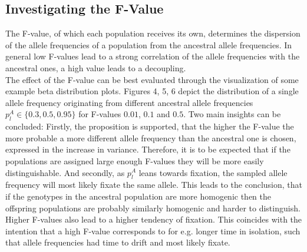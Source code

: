\documentclass[a4paper, 11pt]{article}
\begin{document}
\subsection{Investigating the F-Value}
The F-value, of which each population receives its own, determines the dispersion of the allele frequencies of a population from the ancestral allele frequencies. In general low F-values lead to a strong correlation of the allele frequencies with the ancestral ones, a high value leads to a decoupling.\\
The effect of the F-value can be best evaluated through the visualization of some example beta distribution plots. Figures 4, 5, 6 depict the distribution of a single allele frequency originating from different ancestral allele frequencies $p^A_l \in \{0.3, 0.5, 0.95\}$ for F-values $0.01$, $0.1$ and $0.5$. Two main insights can be concluded: Firstly, the proposition is supported, that the higher the F-value the more probable a more different allele frequency than the ancestral one is chosen, expressed in the increase in variance. Therefore, it is to be expected that if the populations are assigned large enough F-values they will be more easily distinguishable. And secondly, as $p_l^A$ leans towards fixation, the sampled allele frequency will most likely fixate the same allele. This leads to the conclusion, that if the genotypes in the ancestral population are more homogenic then the offspring populations are probably similarly homogenic and harder to distinguish. Higher F-values also lead to a higher tendency of fixation. This coincides with the intention that a high F-value corresponds to for e.g. longer time in isolation, such that allele frequencies had time to drift and most likely fixate.\\
\end{document}

